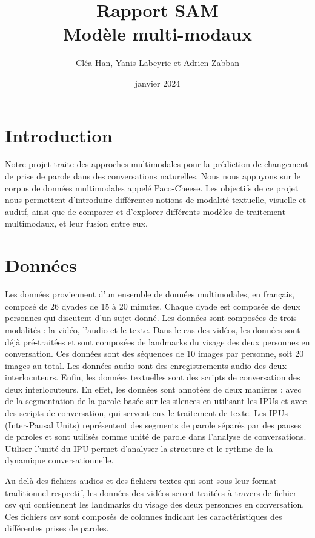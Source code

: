 \documentclass[a4paper]{article}
\title{Rapport SAM \\ Modèle multi-modaux}
\author{Cléa Han, Yanis Labeyrie et Adrien Zabban}
\date{janvier 2024}
\begin{document}
\maketitle

\section{Introduction}

Notre projet traite des approches multimodales pour la prédiction de changement de prise de parole dans des conversations naturelles. 
Nous nous appuyons sur le corpus de données multimodales appelé Paco-Cheese.
Les objectifs de ce projet nous permettent d'introduire différentes notions de modalité textuelle, visuelle et auditf, ainsi que de
comparer et d'explorer différents modèles de traitement multimodaux, et leur fusion entre eux.

\section{Données}

Les données proviennent d'un ensemble de données multimodales, en français, composé de 26 dyades de 15 à 20 minutes.
Chaque dyade est composée de deux personnes qui discutent d'un sujet donné. Les données sont composées de trois modalités : la vidéo,
l'audio et le texte.
Dans le cas des vidéos, les données sont déjà pré-traitées et sont composées de landmarks du visage des deux personnes en conversation. 
Ces données sont des séquences de 10 images par personne, soit 20 images au total. Les données audio sont des enregistrements audio
des deux interlocuteurs. Enfin, les données textuelles sont des scripts de conversation des deux interlocuteurs.
En effet, les données sont annotées de deux manières : avec de la segmentation de la parole basée sur les silences en utilisant les
IPUs et avec des scripts de conversation, qui servent eux le traitement de texte. 
Les IPUs (Inter-Pausal Units) représentent des segments de parole séparés par des pauses de paroles et sont utilisés comme unité de
parole dans l'analyse de conversations.
Utiliser l'unité du IPU permet d'analyser la structure et le rythme de la dynamique conversationnelle. 

Au-delà des fichiers audios et des fichiers textes qui sont sous leur format traditionnel respectif, 
les données des vidéos seront traitées à travers de fichier csv qui contiennent les landmarks du visage des deux personnes en
conversation. Ces fichiers csv sont composés de colonnes indicant les caractéristiques des différentes prises de paroles. 
\end{document}
